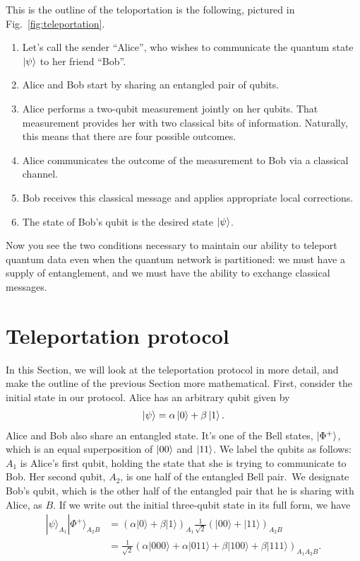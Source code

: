 This is the outline of the teloportation is the following, pictured in Fig.~\ref{fig:teleportation}.
\begin{enumerate}
    \item Let's call the sender ``Alice'', who wishes to communicate the quantum state $\left| \psi \right\rangle$ to her friend ``Bob''.
    \item Alice and Bob start by sharing an entangled pair of qubits.
    \item Alice performs a two-qubit measurement jointly on her qubits. That measurement provides her with two classical bits of information.
    Naturally, this means that there are four possible outcomes.
    \item Alice communicates the outcome of the measurement to Bob via a classical channel.
    \item Bob receives this classical message and applies appropriate local corrections.
    \item The state of Bob's qubit is the desired state $\left| \psi \right\rangle$.
\end{enumerate} 

Now you see the two conditions necessary to maintain our ability to teleport quantum data even when the quantum network is partitioned: we must have a supply of entanglement, and we must have the ability to exchange classical messages.



\section{Teleportation protocol}
\label{sec:8-2_teleportation_protocol}

In this Section, we will look at the teleportation protocol in more detail, and make the outline of the previous Section more mathematical.
First, consider the initial state in our protocol.
Alice has an arbitrary qubit given by
\begin{align}
    \left| \psi \right\rangle = \alpha\left| 0 \right\rangle + \beta\left| 1 \right\rangle.
\end{align}
Alice and Bob also share an entangled state.
It's one of the Bell states, $\left| \Phi^+ \right\rangle$, which is an equal superposition of $\left| 00 \right\rangle$ and $\left| 11 \right\rangle$.
We label the qubits as follows: $A_1$ is Alice's first qubit, holding the state that she is trying to communicate to Bob. 
Her second qubit, $A_2$, is one half of the entangled Bell pair.\
We designate Bob's qubit, which is the other half of the entangled pair that he is sharing with Alice, as $B$.
If we write out the initial three-qubit state in its full form, we have
\begin{align}
    |\psi\rangle_{A_{1}}|\Phi^{+}\rangle_{A_{2} B} &=(\alpha|0\rangle+\beta|1\rangle)_{A_{1}} \frac{1}{\sqrt{2}}(|00\rangle+|11\rangle)_{A_{2} B} \nonumber\\
    &=\frac{1}{\sqrt{2}}(\alpha|000\rangle+\alpha|011\rangle+\beta|100\rangle+\beta|111\rangle)_{A_{1} A_{2} B}.
    \label{eq:teleportation_initial_state}
\end{align}

